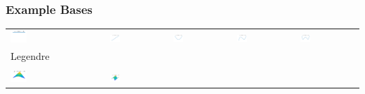 \documentclass[11pt,compress,xcolor={usenames,dvipsnames},aspectratio=169]{beamer}
\begin{document}
\begin{frame}
\frametitle{Example Bases}
\vspace{-3ex}
	\begin{tabular}{>{\centering}m{}>{\centering}m{}>{\centering}m{}>{\centering}m{}>{\centering}m{}}
		\includegraphics[width =0.18\textwidth]{ProgramsImages/Legendre_Degree_0.png}  &
		\includegraphics[width =0.18\textwidth]{ProgramsImages/Legendre_Degree_1.png}  &
		\includegraphics[width =0.18\textwidth]{ProgramsImages/Legendre_Degree_2.png}  &
		\includegraphics[width =0.18\textwidth]{ProgramsImages/Legendre_Degree_3.png}  &
		\includegraphics[width =0.18\textwidth]{ProgramsImages/Legendre_Degree_4.png} 
	\tabularnewline[-7ex]
	Legendre
	\tabularnewline
	\tabularnewline
		\includegraphics[width =0.18\textwidth]{ProgramsImages/Legendre_Degree_1_1.png}  &
\includegraphics[width =0.18\textwidth]{ProgramsImages/Legendre_Degree_1_2.png}  &

\end{tabular}
\end{frame}
\end{document}
